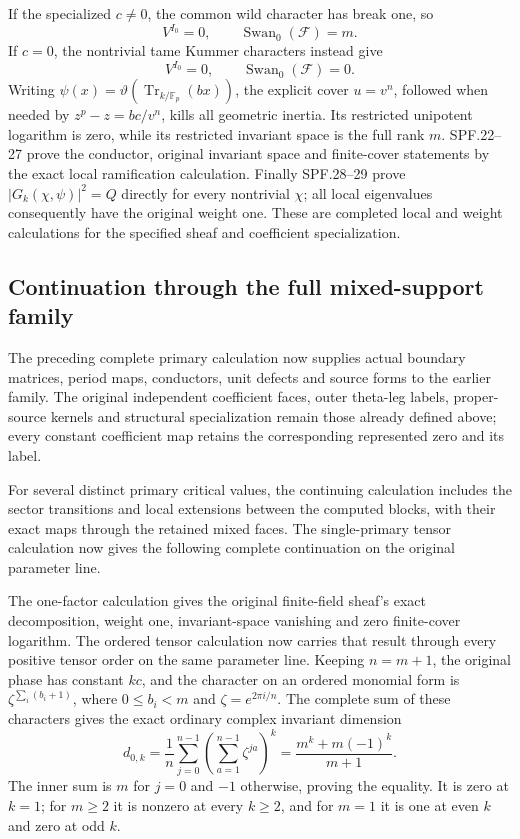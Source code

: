 \documentclass[11pt]{article}
\begin{document}
If the specialized \(c\ne0\), the common wild character has break
one, so
\[
 V^{I_0}=0,\qquad \operatorname{Swan}_0(\mathcal F)=m.
\]
If \(c=0\), the nontrivial tame Kummer characters instead give
\[
 V^{I_0}=0,\qquad \operatorname{Swan}_0(\mathcal F)=0.
\]
Writing \(\psi(x)=\vartheta(\operatorname{Tr}_{k/\mathbb F_p}(bx))\),
the explicit cover \(u=v^n\), followed when needed by
\(z^p-z=bc/v^n\), kills all geometric inertia.  Its restricted
unipotent logarithm is zero, while its restricted invariant space
is the full rank \(m\).  SPF.22--27 prove the conductor, original
invariant space and finite-cover statements by the exact local
ramification calculation.
Finally SPF.28--29 prove
\(|G_k(\chi,\psi)|^2=Q\) directly for every nontrivial \(\chi\);
all local eigenvalues consequently have the original weight one.
These are completed local and weight calculations for the specified
sheaf and coefficient specialization.

\subsection{Continuation through the full mixed-support family}

The preceding complete primary calculation now supplies actual
boundary matrices, period maps, conductors, unit defects and source
forms to the earlier family.  The original independent coefficient
faces, outer theta-leg labels, proper-source kernels and structural
specialization remain those already defined above; every constant
coefficient map retains the corresponding represented zero and its
label.

For several distinct primary critical values, the continuing calculation
includes the sector transitions and local extensions between the computed
blocks, with their exact maps through the retained mixed faces.  The
single-primary tensor calculation now gives the following complete
continuation on the original parameter line.

The one-factor calculation gives the original finite-field sheaf's
exact decomposition, weight one, invariant-space vanishing and zero
finite-cover logarithm.  The ordered tensor calculation now carries
that result through every positive tensor order on the same parameter
line.  Keeping \(n=m+1\), the original phase has constant \(kc\),
and the character on an ordered monomial form is
\(\zeta^{\sum_i(b_i+1)}\), where \(0\leq b_i<m\) and
\(\zeta=e^{2\pi i/n}\).  The complete sum of these characters
gives the exact ordinary complex invariant dimension
\[
 d_{0,k}=\frac1n\sum_{j=0}^{n-1}
           \left(\sum_{a=1}^{n-1}\zeta^{ja}\right)^k
        =\frac{m^k+m(-1)^k}{m+1}.
 \tag{SPBT.1}\label{eq:spbt1}
\]
The inner sum is \(m\) for \(j=0\) and \(-1\) otherwise,
proving the equality.  It is zero at \(k=1\); for \(m\geq2\)
it is nonzero at every \(k\geq2\), and for \(m=1\) it is one
at even \(k\) and zero at odd \(k\).
\end{document}
